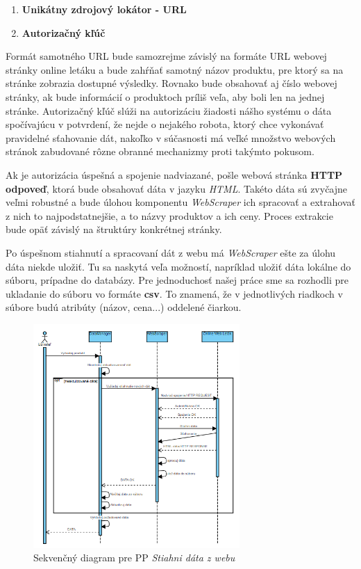\documentclass[twoside,slovak, a4paper]{article}
\begin{document}
\begin{enumerate}
    \item \textbf{Unikátny zdrojový lokátor - URL}
    \item \textbf{Autorizačný kľúč}
\end{enumerate} 

Formát samotného URL bude samozrejme závislý na formáte URL webovej stránky online letáku a bude zahŕňať samotný názov produktu, pre ktorý sa na stránke zobrazia dostupné výsledky. Rovnako bude obsahovať aj číslo webovej stránky, ak bude informácií o produktoch príliš veľa, aby boli len na jednej stránke. Autorizačný kľúč slúži na autorizáciu žiadosti nášho systému o dáta spočívajúcu v potvrdení, že nejde o nejakého robota, ktorý chce vykonávať pravidelné sťahovanie dát, nakoľko v súčasnosti má veľké množstvo  webových stránok zabudované rôzne obranné mechanizmy proti takýmto pokusom.

Ak je autorizácia úspešná a spojenie nadviazané, pošle webová stránka \textbf{HTTP odpoveď}, ktorá bude obsahovať dáta v jazyku \textit{HTML}. Takéto dáta sú zvyčajne veľmi robustné a bude úlohou komponentu \textit{WebScraper} ich spracovať a extrahovať z nich to najpodstatnejšie, a to názvy produktov a ich ceny. Proces extrakcie bude opäť závislý na štruktúry konkrétnej stránky.

Po úspešnom stiahnutí a spracovaní dát z webu má \textit{WebScraper} ešte za úlohu dáta niekde uložiť. Tu sa naskytá veľa možností, napríklad uložiť dáta lokálne do súboru, prípadne do databázy. Pre jednoduchosť našej práce sme sa rozhodli pre ukladanie do súboru vo formáte \textbf{csv}. To znamená, že v jednotlivých riadkoch v súbore budú atribúty (názov, cena...) oddelené čiarkou.

\begin{figure}[tbh]
    \centering
    \includegraphics[width=0.7\textwidth]{pics/design/web_scraping.png}
    \caption{Sekvenčný diagram pre PP \textit{Stiahni dáta z webu}}
    \label{fig:9}
\end{figure}
\end{document}
